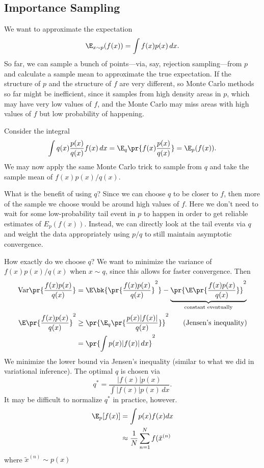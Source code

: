 \documentclass{article}
\begin{document}
\subsection{Importance Sampling}


We want to approximate the expectation \[\E_{x\sim p}(f(x)) = \int f(x) p(x)\,dx.\]
So far, we can sample a bunch of points---via, say, rejection sampling---from $p$ and calculate a sample mean to approximate the true expectation. If the structure of $p$ and the structure of $f$ are very different, so Monte Carlo methods so far might be inefficient, since it samples from high density areas in $p$, which may have very low values of $f$, and the Monte Carlo may miss areas with high values of $f$ but low probability of happening. 

\medskip

Consider the integral \[
\int q(x) \frac{p(x)}{q(x)}f(x)\,dx = \E_q\pr{f(x)\frac{p(x)}{q(x)}} = \E_{p}(f(x)).
\]
We may now apply the same Monte Carlo trick to sample from $q$ and take the sample mean of $f(x) p(x)/q(x)$.

\medskip

What is the benefit of using $q$? Since we can choose $q$ to be closer to $f$, then more of the sample we choose would be around high values of $f$. Here we don't need to wait for some low-probability tail event in $p$ to happen in order to get reliable estimates of $E_p(f(x)).$ Instead, we can directly look at the tail events via $q$ and weight the data appropriately using $p/q$ to still maintain asymptotic convergence.

How exactly do we choose $q$? We want to minimize the variance of $f(x)p(x)/q(x)$ when $x\sim q$, since this allows for faster convergence. Then \begin{align*}
\text{Var}\pr{\frac{f(x)p(x)}{q(x)}} &= \E\bk{\pr{\frac{f(x)p(x)}{q(x)}}^2} - \underbrace{\pr{\E\pr{\frac{f(x)p(x)}{q(x)}}}^2}_{\text{constant eventually}} \\
\E\pr{\frac{f(x)p(x)}{q(x)}}^2 &\ge \pr{\E_q\pr{\frac{p(x)|f(x)|}{q(x)}}}^2 \tag{Jensen's inequality}\\
&= \pr{\int p(x)|f(x)|\,dx}^2
\end{align*}
We minimize the lower bound via Jensen's inequality (similar to what we did in variational inference). The optimal $q$ is chosen via \[
q^* = \frac{|f(x)|p(x)}{
    \int |f(x)|p(x)\,dx
}.
\]
It may be difficult to normalize $q^*$ in practice, however. 
\begin{align*}
    \E_{p}[f(x)] & = \int p(x) f(x) dx \\
    & \approx \frac{1}{N} \sum_{n=1}^{N} f(\tilde{x}^{(n)} 
\end{align*}
where $\tilde{x}^{(n)} \sim p(x)$
\end{document}
